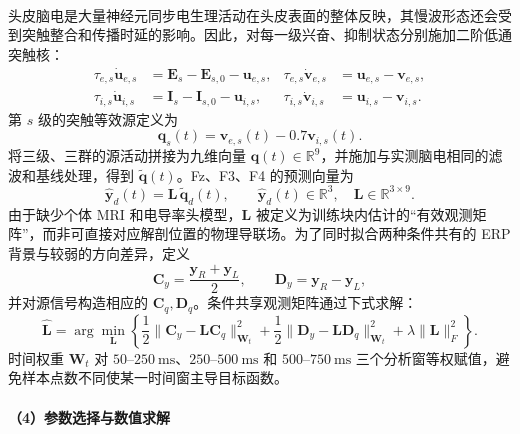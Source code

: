 \documentclass[a4paper,zihao=-4,linespread=1]{ctexart}
\numberwithin{figure}{section}       %
\newcommand{\upcite}[1]{\textsuperscript{\cite{#1}}} %
\begin{document}
头皮脑电是大量神经元同步电生理活动在头皮表面的整体反映\upcite{han2020eeg}，其慢波形态还会受到突触整合和传播时延的影响。因此，对每一级兴奋、抑制状态分别施加二阶低通突触核：
\begin{align}
\tau_{e,s}\dot{\boldsymbol u}_{e,s}
&=\boldsymbol E_s-\boldsymbol E_{s,0}-\boldsymbol u_{e,s},
&
\tau_{e,s}\dot{\boldsymbol v}_{e,s}
&=\boldsymbol u_{e,s}-\boldsymbol v_{e,s}, \label{eq:q2_syn_e}\\
\tau_{i,s}\dot{\boldsymbol u}_{i,s}
&=\boldsymbol I_s-\boldsymbol I_{s,0}-\boldsymbol u_{i,s},
&
\tau_{i,s}\dot{\boldsymbol v}_{i,s}
&=\boldsymbol u_{i,s}-\boldsymbol v_{i,s}. \label{eq:q2_syn_i}
\end{align}
第 $s$ 级的突触等效源定义为
\begin{equation}
\boldsymbol q_s(t)=
\boldsymbol v_{e,s}(t)-0.7\boldsymbol v_{i,s}(t).
\label{eq:q2_source}
\end{equation}
将三级、三群的源活动拼接为九维向量 $\boldsymbol q(t)\in\mathbb R^9$，并施加与实测脑电相同的滤波和基线处理，得到 $\widetilde{\boldsymbol q}(t)$。Fz、F3、F4 的预测向量为
\begin{equation}
\widehat{\boldsymbol y}_d(t)
=\boldsymbol L\,\widetilde{\boldsymbol q}_d(t),
\qquad
\widehat{\boldsymbol y}_d(t)\in\mathbb R^3,\quad
\boldsymbol L\in\mathbb R^{3\times 9}.
\label{eq:q2_observation}
\end{equation}
由于缺少个体 MRI 和电导率头模型，$\boldsymbol L$ 被定义为训练块内估计的“有效观测矩阵”，而非可直接对应解剖位置的物理导联场。为了同时拟合两种条件共有的 ERP 背景与较弱的方向差异，定义
\[
\boldsymbol C_y=\frac{\boldsymbol y_R+\boldsymbol y_L}{2},
\qquad
\boldsymbol D_y=\boldsymbol y_R-\boldsymbol y_L,
\]
并对源信号构造相应的 $\boldsymbol C_q,\boldsymbol D_q$。条件共享观测矩阵通过下式求解：
\begin{equation}
\widehat{\boldsymbol L}
=\arg\min_{\boldsymbol L}
\left\{
\frac12\|\boldsymbol C_y-\boldsymbol L\boldsymbol C_q\|_{\boldsymbol W_t}^{2}
+\frac12\|\boldsymbol D_y-\boldsymbol L\boldsymbol D_q\|_{\boldsymbol W_t}^{2}
+\lambda\|\boldsymbol L\|_F^2
\right\}.
\label{eq:q2_readout}
\end{equation}
时间权重 $\boldsymbol W_t$ 对 $50$--$250~\mathrm{ms}$、$250$--$500~\mathrm{ms}$ 和 $500$--$750~\mathrm{ms}$ 三个分析窗等权赋值，避免样本点数不同使某一时间窗主导目标函数。

\paragraph{（4）参数选择与数值求解}
\end{document}
